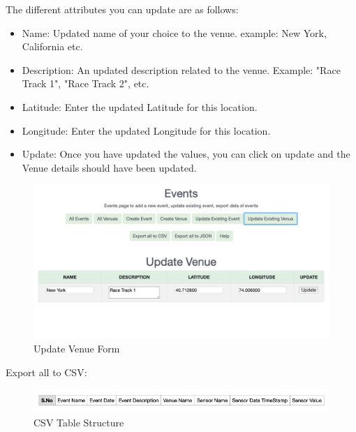\documentclass[12pt, letterpaper]{article}
\begin{document}
{{{{{{{{{\par The different attributes you can update are as follows: 
\begin{itemize}
	\item Name: Updated name of your choice to the venue. example: New York, California etc.
	\item Description: An updated description related to the venue. Example: "Race Track 1", "Race Track 2", etc.
	\item Latitude: Enter the updated Latitude for this location.
	\item Longitude: Enter the updated Longitude for this location.
	\item Update: Once you have updated the values, you can click on update and the Venue details should have been updated.
\end{itemize}
\begin{figure}[h!]
	\centering
	\includegraphics[width=1\columnwidth]{assets/update_venue.png}
	\caption{Update Venue Form}
	\end{figure}
	
 \newpage \par Export all to CSV:

\begin{figure}[h!]
	\centering
	\includegraphics[width=1\columnwidth]{assets/csv_structure.png}
	\caption{CSV Table Structure}
	\end{figure}
	
}}}}}}}}}
\end{document}
